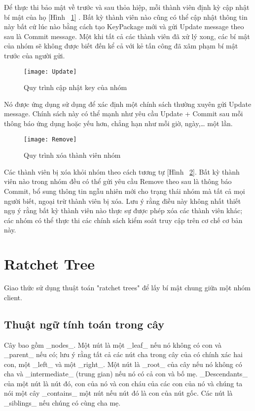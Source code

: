 \documentclass[../main-report.tex]{subfiles}
\begin{document}
Để thực thi bảo mật về trước và sau thỏa hiệp, mỗi thành viên định kỳ cập nhật bí mật của họ [Hình ~\ref{fig:update}] . Bất kỳ thành viên nào cũng có thể cập nhật thông tin này bất cứ lúc nào bằng cách tạo KeyPackage mới và gửi Update message theo sau là Commit message. Một khi tất cả các thành viên đã xử lý xong, các bí mật của nhóm sẽ không được biết đến kể cả với kẻ tấn công đã xâm phạm bí mật trước của người gửi. 

\begin{figure}[!h]
\begin{center}
\label{fig:update}
\texttt{[image: Update]}
\caption{Quy trình cập nhật key của nhóm}
\end{center}
\end{figure}

Nó được ứng dụng sử dụng để xác định một chính sách thường xuyên gửi Update message. Chính sách này có thể mạnh như yêu cầu Update + Commit sau mỗi thông báo ứng dụng hoặc yếu hơn, chẳng hạn như mỗi giờ, ngày,… một lần. 

\begin{figure}[!h]
\begin{center}
\label{fig:remove}
\texttt{[image: Remove]}
\caption{Quy trình xóa thành viên nhóm}
\end{center}
\end{figure}

Các thành viên bị xóa khỏi nhóm theo cách tương tự [Hình ~\ref{fig:remove}]. Bất kỳ thành viên nào trong nhóm đều có thể gửi yêu cầu \gls{Remove} theo sau là thông báo \gls{Commit}, bổ sung thông tin ngẫu nhiên mới cho trạng thái nhóm mà tất cả mọi người biết, ngoại trừ thành viên bị xóa. Lưu ý rằng điều này không nhất thiết ngụ ý rằng bất kỳ thành viên nào thực sự được phép xóa các thành viên khác; các nhóm có thể thực thi các chính sách kiểm soát truy cập trên cơ chế cơ bản này.



\section{Ratchet Tree}
Giao thức sử dụng thuật toán "ratchet trees" để lấy bí mật chung giữa một nhóm client.

\subsection{Thuật ngữ tính toán trong cây}
Cây bao gồm \_nodes\_. Một nút là một \_leaf\_ nếu nó không có con và \_parent\_ nếu có; lưu ý rằng tất cả các nút cha trong cây của có chính xác hai con, một \_left\_ và một \_right\_. Một nút là \_root\_ của cây nếu nó không có cha và \_intermediate\_ (trung gian) nếu nó có cả con và bố mẹ. \_Descendants\_ của một nút là nút đó, con của nó và con cháu của các con của nó và chúng ta nói một cây \_contains\_ một nút nếu nút đó là con của nút gốc. Các nút là \_siblings\_ nếu chúng có cùng cha mẹ.
\end{document}

